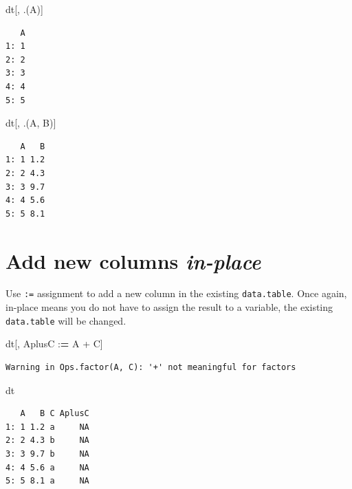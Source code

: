 \documentclass[
]{book}
\newenvironment{Shaded}{\begin{snugshade}}{\end{snugshade}}
\newcommand{\ErrorTok}[1]{\textcolor[rgb]{0.64,0.00,0.00}{\textbf{#1}}}
\newcommand{\NormalTok}[1]{#1}
\newcommand{\SpecialCharTok}[1]{\textcolor[rgb]{0.00,0.00,0.00}{#1}}
\begin{document}
\begin{Shaded}
\begin{Highlighting}[]
\NormalTok{dt[, .(A)]}
\end{Highlighting}
\end{Shaded}

\begin{verbatim}
   A
1: 1
2: 2
3: 3
4: 4
5: 5
\end{verbatim}

\begin{Shaded}
\begin{Highlighting}[]
\NormalTok{dt[, .(A, B)]}
\end{Highlighting}
\end{Shaded}

\begin{verbatim}
   A   B
1: 1 1.2
2: 2 4.3
3: 3 9.7
4: 4 5.6
5: 5 8.1
\end{verbatim}

\hypertarget{add-new-columns-in-place}{%
\section{\texorpdfstring{Add new columns \textbf{\emph{in-place}}}{Add new columns in-place}}\label{add-new-columns-in-place}}

Use \texttt{:=} assignment to add a new column in the existing \texttt{data.table}.
Once again, in-place means you do not have to assign the result to a variable, the existing \texttt{data.table} will be changed.

\begin{Shaded}
\begin{Highlighting}[]
\NormalTok{dt[, AplusC }\SpecialCharTok{:}\ErrorTok{=}\NormalTok{ A }\SpecialCharTok{+}\NormalTok{ C]}
\end{Highlighting}
\end{Shaded}

\begin{verbatim}
Warning in Ops.factor(A, C): '+' not meaningful for factors
\end{verbatim}

\begin{Shaded}
\begin{Highlighting}[]
\NormalTok{dt}
\end{Highlighting}
\end{Shaded}

\begin{verbatim}
   A   B C AplusC
1: 1 1.2 a     NA
2: 2 4.3 b     NA
3: 3 9.7 b     NA
4: 4 5.6 a     NA
5: 5 8.1 a     NA
\end{verbatim}
\end{document}
